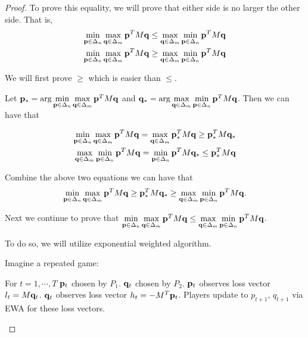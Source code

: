 \documentclass[../main.tex]{subfiles}
\begin{document}
	\begin{proof}
		To prove this equality, we will prove that either side is no larger the other side. That is, 
		\begin{equation*}
		\begin{aligned}
		\min\limits_{\mathbf{p} \in \Delta_n} \max\limits_{\mathbf{q} \in \Delta_m} \mathbf{p}^T M \mathbf{q} \leq \max\limits_{\mathbf{q} \in \Delta_m} 	\min\limits_{\mathbf{p} \in \Delta_n} \mathbf{p}^T M \mathbf{q} \\
		\min\limits_{\mathbf{p} \in \Delta_n} \max\limits_{\mathbf{q} \in \Delta_m} \mathbf{p}^T M \mathbf{q} \geq \max\limits_{\mathbf{q} \in \Delta_m} 	\min\limits_{\mathbf{p} \in \Delta_n} \mathbf{p}^T M \mathbf{q}
		\end{aligned}
		\end{equation*}
		
		We will first prove $\geq$ which is easier than $\leq$.
		
		Let $\mathbf{p}_* = \arg\min\limits_{\mathbf{p} \in \Delta_n} \max\limits_{\mathbf{q} \in \Delta_m} \mathbf{p}^T M \mathbf{q}$ and $\mathbf{q}_* = \arg \max\limits_{\mathbf{q} \in \Delta_m} 	\min\limits_{\mathbf{p} \in \Delta_n} \mathbf{p}^T M \mathbf{q}$. Then we can have that 
		
		\begin{equation*}
		\begin{aligned}
		\min\limits_{\mathbf{p} \in \Delta_n} \max\limits_{\mathbf{q} \in \Delta_m}  \mathbf{p}^T M \mathbf{q}  =  \max\limits_{\mathbf{q} \in \Delta_m}  \mathbf{p}_*^T M \mathbf{q} \geq \mathbf{p}_*^TM\mathbf{q}_* \\
		\max\limits_{\mathbf{q} \in \Delta_m} 	\min\limits_{\mathbf{p} \in \Delta_n} \mathbf{p}^T M \mathbf{q} = 	\min\limits_{\mathbf{p} \in \Delta_n} \mathbf{p}^T M \mathbf{q}_* \leq \mathbf{p}_*^T M \mathbf{q} 
		\end{aligned}
		\end{equation*}
		
		Combine the above two equations we can have that 
		\begin{equation*}
			\min\limits_{\mathbf{p} \in \Delta_n} \max\limits_{\mathbf{q} \in \Delta_m}  \mathbf{p}^T M \mathbf{q} \geq \mathbf{p}_*^TM\mathbf{q}_* \geq 	\max\limits_{\mathbf{q} \in \Delta_m} 	\min\limits_{\mathbf{p} \in \Delta_n} \mathbf{p}^T M \mathbf{q} .
		\end{equation*}
		
		Next we continue to prove that $\min\limits_{\mathbf{p} \in \Delta_n} \max\limits_{\mathbf{q} \in \Delta_m} \mathbf{p}^T M \mathbf{q} \leq \max\limits_{\mathbf{q} \in \Delta_m} 	\min\limits_{\mathbf{p} \in \Delta_n} \mathbf{p}^T M \mathbf{q}$.
		
		To do so, we will utilize exponential weighted algorithm.
		
		Imagine a repeated game:
		\begin{algorithm}
				\begin{algorithmic}
					\STATE For $t = 1, \cdots ,T$
					\bindent
						\STATE $\mathbf{p}_t$ chosen by $P_1$.
						\STATE $\mathbf{q}_t$ chosen by $P_2$.
						\STATE $\mathbf{p}_t$ observes loss vector $l_t = M \mathbf{q}_t$.
						\STATE $\mathbf{q}_t$ observes loss vector $h_t = -M^T \mathbf{p}_t$.
						\STATE Players update to $p_{t+1}$, $q_{t+1}$ via EWA for these loss vectors. 
					\eindent
				\end{algorithmic}
		\end{algorithm}
	

\end{proof}
\end{document}
